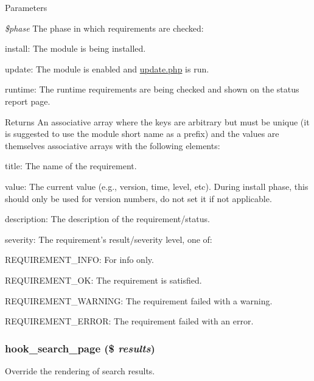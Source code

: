 \begin{DoxyParams}{Parameters}
\item[{\em \$phase}]The phase in which requirements are checked:
\begin{DoxyItemize}
\item install: The module is being installed.
\item update: The module is enabled and \hyperlink{update_8php}{update.php} is run.
\item runtime: The runtime requirements are being checked and shown on the status report page.
\end{DoxyItemize}\end{DoxyParams}
\begin{DoxyReturn}{Returns}
An associative array where the keys are arbitrary but must be unique (it is suggested to use the module short name as a prefix) and the values are themselves associative arrays with the following elements:
\begin{DoxyItemize}
\item title: The name of the requirement.
\item value: The current value (e.g., version, time, level, etc). During install phase, this should only be used for version numbers, do not set it if not applicable.
\item description: The description of the requirement/status.
\item severity: The requirement's result/severity level, one of:
\begin{DoxyItemize}
\item REQUIREMENT\_\-INFO: For info only.
\item REQUIREMENT\_\-OK: The requirement is satisfied.
\item REQUIREMENT\_\-WARNING: The requirement failed with a warning.
\item REQUIREMENT\_\-ERROR: The requirement failed with an error. 
\end{DoxyItemize}
\end{DoxyItemize}
\end{DoxyReturn}
\hypertarget{group__hooks_ga422b9506b3dfd8ed5aa8bfaea98844b9}{
\subsubsection[{hook\_\-search\_\-page}]{\setlength{\rightskip}{0pt plus 5cm}hook\_\-search\_\-page (\$ {\em results})}}
\label{group__hooks_ga422b9506b3dfd8ed5aa8bfaea98844b9}
Override the rendering of search results.

